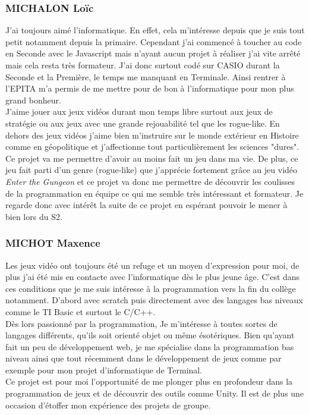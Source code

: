 \documentclass{article}
\begin{document}
\subsubsection{MICHALON Loïc}

J'ai toujours aimé l'informatique. En effet, cela m'intéresse depuis que je suis tout petit notamment depuis la primaire. Cependant j'ai commencé à toucher au code en Seconde avec le Javascript mais n'ayant aucun projet à réaliser j'ai vite arrêté mais cela resta très formateur. J'ai donc surtout codé sur CASIO durant la Seconde et la Première, le temps me manquant en Terminale. Ainsi rentrer à l'EPITA m'a permis de me mettre pour de bon à l'informatique pour mon plus grand bonheur. \\
J'aime jouer aux jeux vidéos durant mon temps libre surtout aux jeux de stratégie ou aux jeux avec une grande rejouabilité tel que les rogue-like. En dehors des jeux vidéos j'aime bien m'instruire sur le monde extérieur en Histoire comme en géopolitique et j'affectionne tout particulièrement les sciences "dures". \\
Ce projet va me permettre d'avoir au moins fait un jeu dans ma vie. De plus, ce jeu fait parti d'un genre (rogue-like) que j'apprécie fortement grâce au jeu vidéo \textit{Enter the Gungeon} et ce projet va donc me permettre de découvrir les coulisses de la programmation en équipe ce qui me semble très intéressant et formateur. Je regarde donc avec intérêt la suite de ce projet en espérant pouvoir le mener à bien lors du S2.

\subsubsection{MICHOT Maxence}

Les jeux vidéo ont toujours été un refuge et un moyen d'expression pour moi, de plus j'ai été mis en contacte avec l'informatique dès le plus jeune âge. C'est dans ces conditions que je me suis intéresse à la programmation vers la fin du collège notamment. D'abord avec scratch puis directement avec des langages bas niveaux comme le TI Basic et surtout le C/C++. \\
Dès lors passionné par la programmation, Je m'intéresse à toutes sortes de langages différents, qu'ils soit orienté objet ou même ésotériques. Bien qu'ayant fait un peu de développement web, je me spécialise dans la programmation bas niveau ainsi que tout récemment dans le développement de jeux comme par exemple pour mon projet d'informatique de Terminal. \\
Ce projet est pour moi l'opportunité de me plonger plus en profondeur dans la programmation de jeux et de découvrir des outils comme Unity. Il est de plus une occasion d'étoffer mon expérience des projets de groupe.
\end{document}
